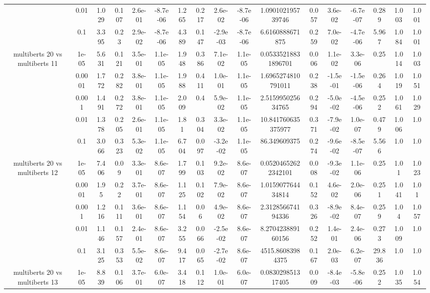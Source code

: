 \begin{tabular}{|c|c|c|c|c|c|c|c|c|c|c|c|c|c|c|c|c|}
 & 0.01 & 1.029 & 0.107 & 2.6e-01 & -8.7e-06 & 1.265 & 0.217 & 2.6e-02 & -8.7e-06 & 1.090102195739746 & 0.057 & 3.6e-02 & -6.7e-07 & 0.289 & 1.003 & 1.001 \\
 & 0.1 & 3.395 & 0.23 & 2.9e-02 & -8.7e-06 & 4.389 & 0.147 & -2.9e-03 & -8.7e-06 & 6.6160888671875 & 0.259 & 7.0e-02 & -4.7e-06 & 5.967 & 1.084 & 1.001 \\
\hline
\multirow{5}{*}{multiberts 20 vs multiberts 11} & 1e-05 & 5.631 & 0.121 & 3.5e-01 & 1.1e-05 & 1.948 & 0.386 & 7.1e-02 & 1.1e-05 & 0.05335218831896701 & 0.006 & 1.1e-02 & 3.3e-06 & 0.25 & 1.014 & 1.003 \\
 & 0.0001 & 1.772 & 0.282 & 3.8e-01 & 1.1e-05 & 1.988 & 0.411 & 1.0e-01 & 1.1e-05 & 1.6965274810791011 & 0.238 & -1.5e-01 & -1.5e-06 & 0.264 & 1.019 & 1.051 \\
 & 0.001 & 1.491 & 0.272 & 3.8e-01 & 1.1e-05 & 2.009 & 0.4 & 5.9e-02 & 1.1e-05 & 2.515995025634765 & 0.294 & -5.0e-02 & -4.5e-06 & 0.252 & 1.061 & 1.029 \\
 & 0.01 & 1.378 & 0.205 & 2.6e-01 & 1.1e-05 & 1.81 & 0.304 & 3.3e-02 & 1.1e-05 & 10.841760635375977 & 0.371 & -7.9e-02 & 1.0e-07 & 0.479 & 1.006 & 1.0 \\
 & 0.1 & 3.066 & 0.323 & 5.3e-02 & 1.1e-05 & 6.704 & 0.097 & -3.2e-02 & 1.1e-05 & 86.349609375 & 0.274 & -9.6e-02 & -8.5e-07 & 5.566 & 1.0 & 1.0 \\
\hline
\multirow{5}{*}{multiberts 20 vs multiberts 12} & 1e-05 & 7.406 & 0.09 & 3.3e-01 & 8.6e-07 & 1.799 & 0.103 & 9.2e-02 & 8.6e-07 & 0.05204652622342101 & 0.008 & -9.3e-02 & 1.1e-06 & 0.25 & 1.01 & 1.023 \\
 & 0.0001 & 1.95 & 0.22 & 3.7e-01 & 8.6e-07 & 1.125 & 0.102 & 7.9e-02 & 8.6e-07 & 1.015907764434814 & 0.152 & 4.6e-02 & 2.0e-06 & 0.251 & 1.041 & 1.01 \\
 & 0.001 & 1.216 & 0.111 & 3.6e-01 & 8.6e-07 & 1.154 & 0.06 & 4.9e-02 & 8.6e-07 & 2.312856674194336 & 0.326 & -8.9e-02 & 8.4e-07 & 0.259 & 1.04 & 1.057 \\
 & 0.01 & 1.146 & 0.157 & 2.4e-01 & 8.6e-07 & 3.255 & 0.066 & -2.5e-02 & 8.6e-07 & 8.270423889160156 & 0.252 & 1.4e-01 & 2.4e-06 & 0.273 & 1.009 & 1.0 \\
 & 0.1 & 3.125 & 0.353 & 5.5e-02 & 8.6e-07 & 9.417 & 0.065 & -2.7e-02 & 8.6e-07 & 4515.86083984375 & 0.167 & 2.0e-03 & 6.2e-07 & 29.836 & 1.0 & 1.0 \\
\hline
\multirow{5}{*}{multiberts 20 vs multiberts 13} & 1e-05 & 8.839 & 0.106 & 3.7e-01 & 6.0e-07 & 3.418 & 0.112 & 1.0e-01 & 6.0e-07 & 0.083029851317405 & 0.009 & -8.4e-03 & -5.8e-06 & 0.252 & 1.035 & 1.054 \\

\end{tabular}
